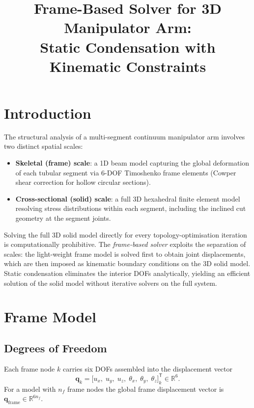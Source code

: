 \documentclass{article}
\title{Frame-Based Solver for 3D Manipulator Arm:\\
Static Condensation with Kinematic Constraints}
\author{}
\date{}
\begin{document}
\maketitle
\tableofcontents
\bigskip

\section{Introduction}
\label{sec:intro}

The structural analysis of a multi-segment continuum manipulator arm involves
two distinct spatial scales:
\begin{itemize}
    \item \textbf{Skeletal (frame) scale}: a 1D beam model capturing the global
          deformation of each tubular segment via 6-DOF Timoshenko frame
          elements (Cowper shear correction for hollow circular sections).
    \item \textbf{Cross-sectional (solid) scale}: a full 3D hexahedral finite
          element model resolving stress distributions within each segment,
          including the inclined cut geometry at the segment joints.
\end{itemize}

Solving the full 3D solid model directly for every topology-optimisation
iteration is computationally prohibitive.  The \emph{frame-based solver}
exploits the separation of scales: the light-weight frame model is solved
first to obtain joint displacements, which are then imposed as kinematic
boundary conditions on the 3D solid model.  Static condensation eliminates
the interior DOFs analytically, yielding an efficient solution of the solid
model without iterative solvers on the full system.

\section{Frame Model}
\label{sec:frame}

\subsection{Degrees of Freedom}

Each frame node $k$ carries six DOFs assembled into the displacement vector
\begin{equation}
    \bm{q}_k = \bigl[u_x,\; u_y,\; u_z,\; \theta_x,\; \theta_y,\; \theta_z\bigr]_k^{\mathsf{T}} \in \mathbb{R}^6.
\end{equation}
For a model with $n_f$ frame nodes the global frame displacement vector is
$\bm{q}_{\text{frame}} \in \mathbb{R}^{6 n_f}$.
\end{document}
